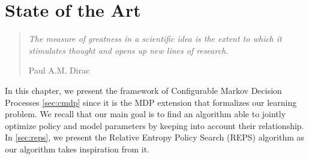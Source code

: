 \chapter{State of the Art}
\label{chapter3}
\thispagestyle{empty}

\begin{quotation}
{\footnotesize
\noindent \emph{The measure of greatness in a scientific idea is the extent to which it stimulates thought and opens up new lines of research.}
\begin{flushright}
 Paul A.M. Dirac
\end{flushright}
}
\end{quotation}
\vspace{0.5cm}

\noindent In this chapter, we present the framework of Configurable Markov Decision Processes \citep{cmdp} \cref{sec:cmdp} since it is the MDP extension that formalizes our learning problem. We recall that our main goal is to find an algorithm able to jointly optimize policy and model parameters by keeping into account their relationship. In \cref{sec:reps}, we present the Relative Entropy Policy Search (REPS) algorithm as our algorithm takes inspiration from it.

